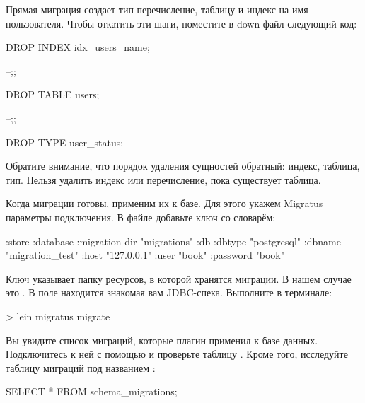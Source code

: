 Прямая миграция создает тип-перечисление, таблицу  и индекс на имя пользователя. Чтобы откатить эти шаги, поместите в down-файл следующий код:

\begin{english}
  \begin{sql}
DROP INDEX idx_users_name;

--;;

DROP TABLE users;

--;;

DROP TYPE user_status;
  \end{sql}
\end{english}

Обратите внимание, что порядок удаления сущностей обратный: индекс, таблица, тип. Нельзя удалить индекс или перечисление, пока существует таблица.

Когда миграции готовы, применим их к базе. Для этого укажем Migratus параметры подключения. В файле  добавьте ключ  со словарём:

\begin{english}
  \begin{clojure}
{:store :database
 :migration-dir "migrations"
 :db {:dbtype "postgresql"
      :dbname "migration_test"
      :host "127.0.0.1"
      :user "book"
      :password "book"}}
  \end{clojure}
\end{english}

Ключ  указывает папку ресурсов, в которой хранятся миграции. В нашем случае это . В поле  находится знакомая вам JDBC-спека. Выполните в терминале:

\begin{english}
  \begin{bash}
> lein migratus migrate
  \end{bash}
\end{english}

Вы увидите список миграций, которые плагин применил к базе данных. Подключитесь к ней с помощью  и проверьте таблицу . Кроме того, исследуйте таблицу миграций под названием :

\begin{english}
  \begin{clojure}
SELECT * FROM schema_migrations;
  \end{clojure}
\end{english}

